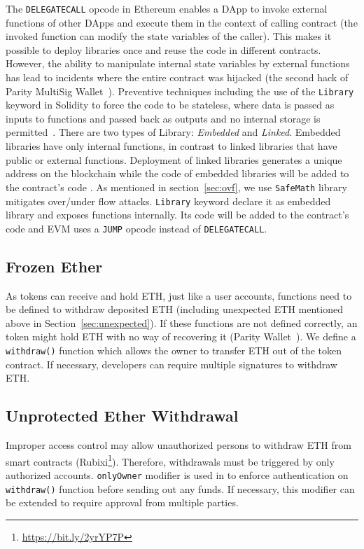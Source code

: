 The \texttt{DELEGATECALL} opcode in Ethereum enables a DApp to invoke external functions of other DApps and execute them in the context of calling contract (\ie the invoked function can modify the state variables of the caller). This makes it possible to deploy libraries once and reuse the code in different contracts. However, the ability to manipulate internal state variables by external functions has lead to incidents where the entire contract was hijacked (\cf the second hack of Parity MultiSig Wallet~\cite{ParitySecondHack}). Preventive techniques including the use of the \texttt{Library} keyword in Solidity to force the code to be stateless, where data is passed as inputs to functions and passed back as outputs and no internal storage is permitted~\cite{LIB1}. There are two types of Library: \textit{Embedded} and \textit{Linked}. Embedded libraries have only internal functions, in contrast to linked libraries that have public or external functions. Deployment of linked libraries generates a unique address on the blockchain while the code of embedded libraries will be added to the contract's code \cite{LIB2}. { \blue As mentioned in section~\ref{sec:ovf}, we use \texttt{SafeMath} library mitigates over/under flow attacks. \texttt{Library} keyword declare it as embedded library and exposes functions internally.} Its code will be added to the \erc contract's code and EVM uses a \texttt{JUMP} opcode instead of \texttt{DELEGATECALL}.

\subsection{Frozen Ether}

As \erc tokens can receive and hold ETH, just like a user accounts, functions need to be defined to withdraw deposited ETH (including unexpected ETH mentioned above in Section~\ref{sec:unexpected}). If these functions are not defined correctly, an \erc token might hold ETH with no way of recovering it (\cf Parity Wallet~\cite{ParityWalletHack}). We define a \texttt{withdraw()} function which allows the owner to transfer ETH out of the token contract. If necessary, developers can require multiple signatures to withdraw ETH.

\subsection{Unprotected Ether Withdrawal}

Improper access control may allow unauthorized persons to withdraw ETH from smart contracts (\cf Rubixi\footnote{\url{https://bit.ly/2yrYP7P}}). Therefore, withdrawals must be triggered by only authorized accounts. \texttt{onlyOwner} modifier is used in \sys to enforce authentication on \texttt{withdraw()} function before sending out any funds. If necessary, this modifier can be extended to require approval from multiple parties.


